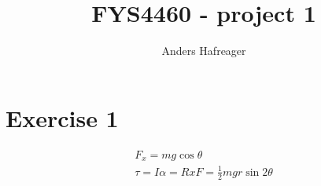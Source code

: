 \documentclass{article}
\newcommand{\f}[2]{\frac{#1}{#2}}
\begin{document}
\author{Anders Hafreager}
\title{FYS4460 - project 1}
\maketitle
\newpage

%
\section*{Exercise 1}
\begin{align*}
F_x = mg\cos\theta\\
\tau = I\alpha = R x F = \f{1}{2}mgr\sin2\theta
\end{align*}
\end{document}
